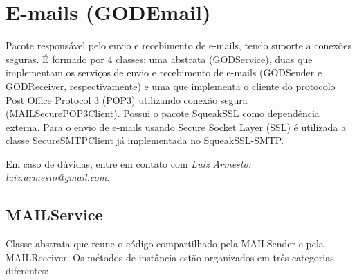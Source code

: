 \section{E-mails (GODEmail)}

Pacote responsável pelo envio e recebimento de e-mails, tendo suporte a conexões seguras. É formado por 4 classes: uma abstrata (GODService), duas que implementam os serviços de envio e recebimento de e-mails (GODSender e GODReceiver, respectivamente) e uma que implementa o cliente do protocolo Post Office Protocol 3 (POP3) utilizando conexão segura (MAILSecurePOP3Client). Possui o pacote SqueakSSL como dependência externa. Para o envio de e-mails usando Secure Socket Layer (SSL) é utilizada a classe SecureSMTPClient já implementada no SqueakSSL-SMTP.

Em caso de dúvidas, entre em contato com \emph{Luiz Armesto: luiz.armesto@gmail.com}.

\subsection{MAILService}

Classe abstrata que reune o código compartilhado pela MAILSender e pela MAILReceiver. Os métodos de instância estão organizados em três categorias diferentes:

